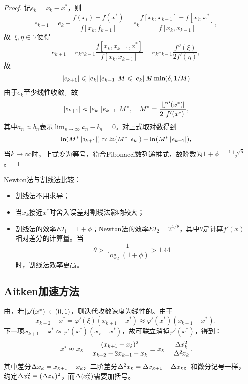 \begin{proof}
    记$e_k=x_k-x^*$，则 
    \[
        e_{k+1}=e_k-\frac{f(x_i)-f(x^*)}{f[x_k,f_{k-1}]}=e_k\frac{f[x_k,x_{k-1}]-f[x_k,x^*]}{f[x_k,x_{k-1}]},
    \]
    故$\exists\xi,\eta\in U$使得
    \[
        e_{k+1}=e_ke_{k-1}\frac{f[x_k,x_{k-1},x^*]}{f[x_k,x_{k-1}]}=e_ke_{k-1}\frac{f''(\xi)}{2f'(\eta)},
    \]
    故
    \[
        \left\lvert e_{k+1}\right\rvert\leqslant\left\lvert e_k\right\rvert\left\lvert e_{k-1}\right\rvert M\leqslant\left\lvert e_k\right\rvert M\min(\delta,1/M)
    \]
    由于$e_k$至少线性收敛，故 %
    \[
        \left\lvert e_{k+1}\right\rvert\approx\left\lvert e_k\right\rvert\left\lvert e_{k-1}\right\rvert M^*,\quad M^*=\frac{\left\lvert f''(x^*)\right\rvert}{2\left\lvert f'(x^*)\right\rvert},
    \]
    其中$a_n\approx b_n$表示$\lim_{n\to\infty}a_n-b_n=0$。对上式取对数得到
    \[
        \ln(M^*\left\lvert e_{k+1}\right\rvert)\approx\ln(M^*\left\lvert e_k\right\rvert)+\ln(M^*\left\lvert e_{k-1}\right\rvert),
    \]
    当$k\to\infty$时，上式变为等号，符合Fibonacci数列递推式，故阶数为$1+\phi=\frac{1+\sqrt5}2$。
\end{proof}

\begin{remark}
    Newton法与割线法比较：
    \begin{itemize}
        \item 割线法不用求导；
        \item 当$x_k$接近$x^*$时舍入误差对割线法影响较大；
        \item 割线法的效率$EI_1=1+\phi$；Newton法的效率$EI_2=2^{1/\theta}$，其中$\theta$是计算$f'(x)$相对差分的计算量。当
        \[
            \theta>\frac1{\log_2(1+\phi)}>1.44
        \]
        时，割线法效率更高。
    \end{itemize}
\end{remark}

\subsection{Aitken加速方法}

由，若$\left\lvert\varphi'(x^*)\right\rvert\in(0,1)$，则迭代收敛速度为线性的。由于
\[
    x_{k+2}-x^*=\varphi'(\xi)(x_{k+1}-x^*)\approx\varphi'(x^*)(x_{k+1}-x^*),
\]
下一项$x_{k+1}-x^*\approx\varphi'(x^*)(x_k-x^*)$，故可联立消掉$\varphi'(x^*)$，得到：
\begin{equation}
    x^*\approx x_k-\frac{(x_{k+1}-x_k)^2}{x_{k+2}-2x_{k+1}+x_k}\equiv x_k-\frac{\Delta x_k^2}{\Delta^2 x_k}.
\end{equation}
其中差分$\Delta x_k=x_{k+1}-x_k$，二阶差分$\Delta^2x_k=\Delta x_{k+1}-\Delta x_k$。和微分记号一样，约定$\Delta x_k^2\equiv(\Delta x_k)^2$，而$\Delta(x_k^2)$需要加括号。

